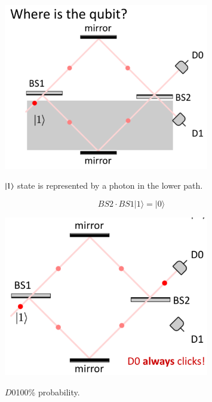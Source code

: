 \begin{figure}[H]
   \centering
    \includegraphics[width=0.8\textwidth]{lesson6/1_ket_bottom.pdf}
    \label{fig: 1}
    
        \caption{$\ket{1}$ state is represented by a photon in the lower path.}
    
\end{figure}

\begin{equation}
B S 2 \cdot B S 1|1\rangle=|0\rangle
\end{equation}

\begin{figure}[H]
   \centering
    \includegraphics[width=0.8\textwidth]{lesson6/d0_always_clicks.pdf}
    \label{fig: 1}
    
        \caption{$D0$100\% probability.}
    
\end{figure}

